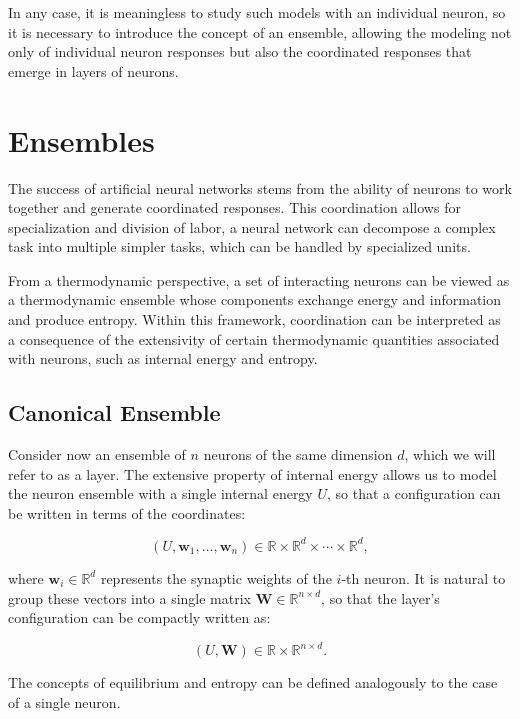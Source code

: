 \documentclass[12pt]{article}
\begin{document}
In any case, it is meaningless to study such models with an individual neuron, so it is necessary to introduce the concept of an ensemble, allowing the modeling not only of individual neuron responses but also the coordinated responses that emerge in layers of neurons.
\section*{Ensembles}

The success of artificial neural networks stems from the ability of neurons to work together and generate coordinated responses. This coordination allows for specialization and division of labor, a neural network can decompose a complex task into multiple simpler tasks, which can be handled by specialized units.

From a thermodynamic perspective, a set of interacting neurons can be viewed as a thermodynamic ensemble whose components exchange energy and information and produce entropy. Within this framework, coordination can be interpreted as a consequence of the extensivity of certain thermodynamic quantities associated with neurons, such as internal energy and entropy.
\subsection*{Canonical Ensemble}

Consider now an ensemble of $n$ neurons of the same dimension $d$, which we will refer to as a layer. The extensive property of internal energy allows us to model the neuron ensemble with a single internal energy $U$, so that a configuration can be written in terms of the coordinates:

\begin{equation}
(U, \mathbf{w}_1, \ldots, \mathbf{w}_n) \in \mathbb{R} \times \mathbb{R}^{d} \times \cdots \times \mathbb{R}^d  ,
\end{equation}

where $\mathbf{w}_i \in \mathbb{R}^d$ represents the synaptic weights of the $i$-th neuron. It is natural to group these vectors into a single matrix $\mathbf{W} \in \mathbb{R}^{n \times d}$, so that the layer’s configuration can be compactly written as:

\begin{equation}
(U, \mathbf{W}) \in \mathbb{R} \times \mathbb{R}^{n \times d}.
\end{equation}

The concepts of equilibrium and entropy can be defined analogously to the case of a single neuron.
\end{document}
